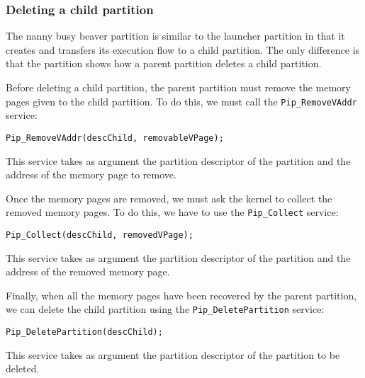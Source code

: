 \documentclass[10pt,a4paper,titlepage]{refart}
\begin{document}
\subsubsection{Deleting a child partition}

The nanny busy beaver partition is similar to the launcher partition in that it
creates and transfers its execution flow to a child partition. The only
difference is that the partition shows how a parent partition deletes a child
partition.

Before deleting a child partition, the parent partition must remove the memory
pages given to the child partition. To do this, we must call the
\texttt{Pip\_RemoveVAddr} service:

\begin{lstlisting}[style=CStyle]
Pip_RemoveVAddr(descChild, removableVPage);
\end{lstlisting}

This service takes as argument the partition descriptor of the partition and the
address of the memory page to remove.

Once the memory pages are removed, we must ask the kernel to collect the removed
memory pages. To do this, we have to use the \texttt{Pip\_Collect} service:

\begin{lstlisting}[style=CStyle]
Pip_Collect(descChild, removedVPage);
\end{lstlisting}

This service takes as argument the partition descriptor of the partition and the
address of the removed memory page.

Finally, when all the memory pages have been recovered by the parent partition,
we can delete the child partition using the \texttt{Pip\_DeletePartition}
service:

\begin{lstlisting}[style=CStyle]
Pip_DeletePartition(descChild);
\end{lstlisting}

This service takes as argument the partition descriptor of the partition to be
deleted.
\end{document}
